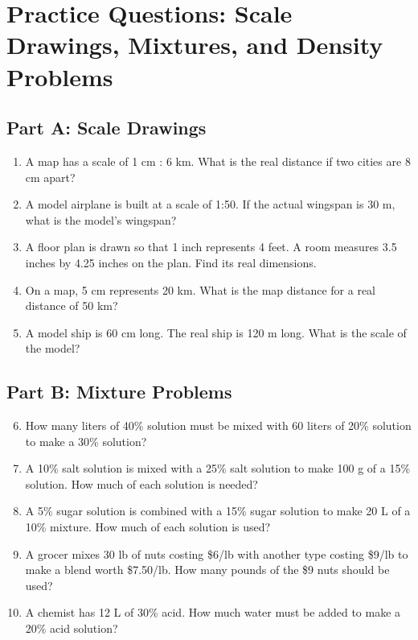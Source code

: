 \documentclass[14pt]{extarticle}
\begin{document}
\newpage


\section*{Practice Questions: Scale Drawings, Mixtures, and Density Problems}

\subsection*{Part A: Scale Drawings}
\begin{enumerate}
  \item A map has a scale of 1 cm : 6 km. What is the real distance if two cities are 8 cm apart?
  \item A model airplane is built at a scale of 1:50. If the actual wingspan is 30 m, what is the model’s wingspan?
  \item A floor plan is drawn so that 1 inch represents 4 feet. A room measures 3.5 inches by 4.25 inches on the plan. Find its real dimensions.
  \item On a map, 5 cm represents 20 km. What is the map distance for a real distance of 50 km?
  \item A model ship is 60 cm long. The real ship is 120 m long. What is the scale of the model?
\end{enumerate}

\subsection*{Part B: Mixture Problems}
\begin{enumerate}
  \setcounter{enumi}{5}
  \item How many liters of 40\% solution must be mixed with 60 liters of 20\% solution to make a 30\% solution?
  \item A 10\% salt solution is mixed with a 25\% salt solution to make 100 g of a 15\% solution. How much of each solution is needed?
  \item A 5\% sugar solution is combined with a 15\% sugar solution to make 20 L of a 10\% mixture. How much of each solution is used?
  \item A grocer mixes 30 lb of nuts costing \$6/lb with another type costing \$9/lb to make a blend worth \$7.50/lb. How many pounds of the \$9 nuts should be used?
  \item A chemist has 12 L of 30\% acid. How much water must be added to make a 20\% acid solution?
\end{enumerate}
\end{document}
